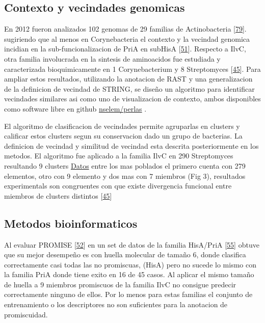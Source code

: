 \documentclass[12pt,twoside]{reedthesis}
\begin{document}
  \subsection{Contexto y vecindades
  genomicas}\label{contexto-y-vecindades-genomicas}
  
  En 2012 fueron analizados 102 genomas de 29 familias de Actinobacteria
  {[}\protect\hyperlink{ref-nodaux5festudioux5f2012}{79}{]}. sugiriendo
  que al menos en Corynebacteria el contexto y la vecindad genomica
  incidian en la sub-funcionalizacion de PriA en subHisA
  {[}\protect\hyperlink{ref-noda-garciaux5fevolutionux5f2013}{51}{]}.
  Respecto a IlvC, otra familia involucrada en la sintesis de aminoacidos
  fue estudiada y caracterizada bioquimicamente en 1 Corynebacterium y 8
  Streptomyces
  {[}\protect\hyperlink{ref-verdel-arandaux5fmolecularux5f2015}{45}{]}.
  Para ampliar estos resultados, utilizando la anotacion de RAST y una
  generalizacion de la definicion de vecindad de STRING, se diseño un
  algoritmo para identificar vecindades similares asi como uno de
  visualizacion de contexto, ambos disponibles como software libre en
  github \href{https://github.com/nselem/perlas}{nselem/perlas} .
  
  El algoritmo de clasificacion de vecindades permite agruparlas en
  clusters y calificar estos clusters segun su conservacion dado un grupo
  de bacterias. La definicion de vecindad y similitud de vecindad esta
  descrita posteriormente en los metodos. El algoritmo fue aplicado a la
  familia IlvC en 290 Streptomyces resultando 9 clusters
  \href{http://148.247.230.43/nselem/CONTEXTS/REL_St275/ilvC/Contextos.php}{Datos}
  entre los mas poblados el primero cuenta con 279 elementos, otro con 9
  elemento y dos mas con 7 miembros (Fig 3), resultados experimentals son
  congruentes con que existe divergencia funcional entre miembros de
  clusters distintos
  {[}\protect\hyperlink{ref-verdel-arandaux5fmolecularux5f2015}{45}{]}
  
  \subsection{Metodos bioinformaticos}\label{metodos-bioinformaticos}
  
  Al evaluar PROMISE
  {[}\protect\hyperlink{ref-carbonellux5fmolecularux5f2010}{52}{]} en un
  set de datos de la familia HisA/PriA
  {[}\protect\hyperlink{ref-noda-garciaux5finsightsux5f2015}{55}{]} obtuve
  que su mejor desempeño es con huella molecular de tamaño 6, donde
  clasifica correctamente casi todas las no promiscuas, (HisA) pero no
  sucede lo mismo con la familia PriA donde tiene exito en 16 de 45 casos.
  Al aplicar el mismo tamaño de huella a 9 miembros promiscuos de la
  familia IlvC no consigue predecir correctamente ninguno de ellos. Por lo
  menos para estas familias el conjunto de entrenamiento o los
  descriptores no son suficientes para la anotacion de promiscuidad.
  
\end{document}
